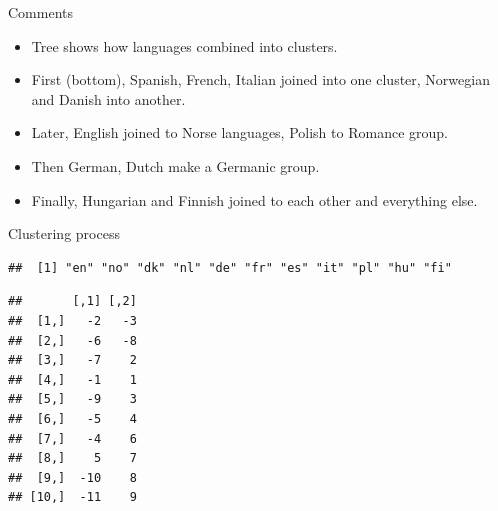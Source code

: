 \documentclass[
  ignorenonframetext,
]{beamer}
\newenvironment{Shaded}{\begin{snugshade}}{\end{snugshade}}
\newcommand{\NormalTok}[1]{#1}
\newcommand{\OperatorTok}[1]{\textcolor[rgb]{0.81,0.36,0.00}{\textbf{#1}}}
\begin{document}
\begin{frame}{Comments}
\protect\hypertarget{comments-26}{}

\begin{itemize}
\item
  Tree shows how languages combined into clusters.
\item
  First (bottom), Spanish, French, Italian joined into one cluster,
  Norwegian and Danish into another.
\item
  Later, English joined to Norse languages, Polish to Romance group.
\item
  Then German, Dutch make a Germanic group.
\item
  Finally, Hungarian and Finnish joined to each other and everything
  else.
\end{itemize}

\end{frame}

\begin{frame}[fragile]{Clustering process}
\protect\hypertarget{clustering-process}{}

\small

\begin{Shaded}
\end{Shaded}

\begin{verbatim}
##  [1] "en" "no" "dk" "nl" "de" "fr" "es" "it" "pl" "hu" "fi"
\end{verbatim}

\begin{Shaded}
\end{Shaded}

\begin{verbatim}
##       [,1] [,2]
##  [1,]   -2   -3
##  [2,]   -6   -8
##  [3,]   -7    2
##  [4,]   -1    1
##  [5,]   -9    3
##  [6,]   -5    4
##  [7,]   -4    6
##  [8,]    5    7
##  [9,]  -10    8
## [10,]  -11    9
\end{verbatim}

\normalsize

\end{frame}
\end{document}
